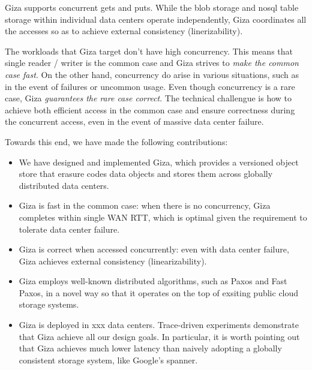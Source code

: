 Giza supports concurrent gets and puts. While the blob storage and nosql table storage within individual data centers operate independently, Giza coordinates all the accesses so as to achieve external consistency (linerizability).

The workloads that Giza target don't have high concurrency. This means that single reader / writer is the common case and Giza strives to {\em make the common case fast}. On the other hand, concurrency do arise in various situations, such as in the event of failures or uncommon usage. Even though concurrency is a rare case, Giza {\em guarantees the rare case correct}. The technical challengue is how to achieve both efficient access in the common case and ensure correctness during the concurrent access, even in the event of massive data center failure.

Towards this end, we have made the following contributions:
\begin{itemize}
    \item We have designed and implemented Giza, which provides a versioned object store that erasure codes data objects and stores them across globally distributed data centers.
    \item Giza is fast in the common case: when there is no concurrency, Giza completes within single WAN RTT, which is optimal given the requirement to tolerate data center failure.
    \item Giza is correct when accessed concurrently: even with data center failure, Giza achieves external consistency (linearizability).
    \item Giza employs well-known distributed algorithms, such as Paxos and Fast Paxos, in a novel way so that it operates on the top of exsiting public cloud storage systems.
    \item Giza is deployed in xxx data centers. Trace-driven experiments demonstrate that Giza achieve all our design goals. In particular, it is worth pointing out that Giza achieves much lower latency than naively adopting a globally consistent storage system, like Google's spanner.
\end{itemize}
